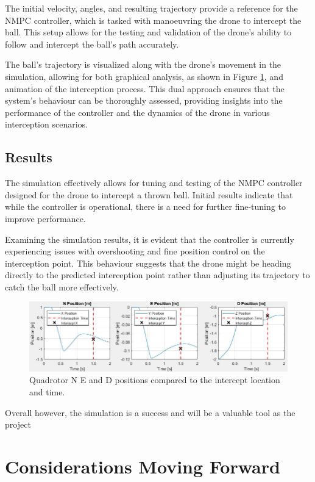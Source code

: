 \documentclass{UoNMCHA}
\numberwithin{equation}{section}
\begin{document}
The initial velocity, angles, and resulting trajectory provide a reference for the NMPC controller, which is tasked with manoeuvring the drone to intercept the ball. This setup allows for the testing and validation of the drone's ability to follow and intercept the ball's path accurately.

The ball's trajectory is visualized along with the drone's movement in the simulation, allowing for both graphical analysis, as shown in Figure \ref{fig:simResults}, and animation of the interception process. This dual approach ensures that the system's behaviour can be thoroughly assessed, providing insights into the performance of the controller and the dynamics of the drone in various interception scenarios.


\subsection{Results}
The simulation effectively allows for tuning and testing of the NMPC controller designed for the drone to intercept a thrown ball. Initial results indicate that while the controller is operational, there is a need for further fine-tuning to improve performance.

Examining the simulation results, it is evident that the controller is currently experiencing issues with overshooting and fine position control on the interception point. This behaviour suggests that the drone might be heading directly to the predicted interception point rather than adjusting its trajectory to catch the ball more effectively.

\begin{figure}[H]
    \centering
    \includegraphics[width=1\linewidth]{Figures/SimResults.JPG}
    \caption{Quadrotor N E and D positions compared to the intercept location and time.}
    \label{fig:simResults} %
\end{figure}

Overall however, the simulation is a success and will be a valuable tool as the project 

\section{Considerations Moving Forward}
\end{document}
